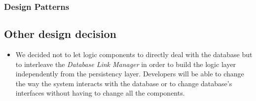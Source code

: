 \documentclass[DD.tex]{subfiles}
\begin{document}
\subsubsection{Design Patterns}


\newpage

\subsection{Other design decision}

\begin{itemize}
	\item We decided not to let logic components to directly deal with the database but to interleave the \textit{Database Link Manager} in order to build the logic layer independently from the persistency layer. Developers will be able to change the way the system interacts with the database or to change database's interfaces without having to change all the components. 
\end{itemize}
\end{document}
